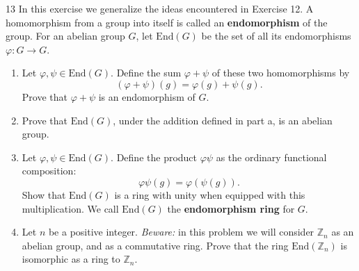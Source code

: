 \begin{problem}{13}
    In this exercise we generalize the ideas encountered in Exercise 12. A homomorphism
    from a group into itself is called an \textbf{endomorphism} of the group. For an
    abelian group $G$, let $\mathrm{End}(G)$ be the set of all its endomorphisms
    $\varphi : G \to G$.
    \begin{enumerate}
        \item[(a)] Let $\varphi, \psi \in \mathrm{End}(G)$. Define the sum
        $\varphi + \psi$ of these two homomorphisms by
        \[(\varphi + \psi)(g) = \varphi(g) + \psi(g).\]
        Prove that $\varphi + \psi$ is an endomorphism of $G$.
        \item[(b)] Prove that $\mathrm{End}(G)$, under the addition defined in part a, is
        an abelian group.
        \item[(c)] Let $\varphi, \psi \in \mathrm{End}(G)$. Define the product
        $\varphi\psi$ as the ordinary functional composition:
        \[\varphi\psi(g) = \varphi(\psi(g)).\]
        Show that $\mathrm{End}(G)$ is a ring with unity when equipped with this
        multiplication. We call $\mathrm{End}(G)$ the \textbf{endomorphism ring} for $G$.
        \item[(d)] Let $n$ be a positive integer. \emph{Beware:} in this problem we will
        consider $\mathbb{Z}_n$ as an abelian group, and as a commutative ring. Prove that
        the ring $\mathrm{End}(\mathbb{Z}_n)$ is isomorphic as a ring to $\mathbb{Z}_n$.
    \end{enumerate}
\end{problem}
\unsolved
